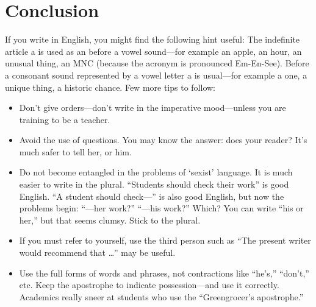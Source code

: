 \chapter{Conclusion}
\label{chap:six}

If you write in English, you might find the following hint
useful: The indefinite article a is used as an before a
vowel sound---for example an apple, an hour, an unusual
thing, an \ac{MNC} (because the acronym is pronounced Em-En-See). Before a consonant sound represented
by a vowel letter a is usual---for example a one, a
unique thing, a historic chance. Few more tips to follow:


\begin{itemize}
\item Don't give orders---don't write in the imperative mood---unless you are training to be a teacher.
\item Avoid the use of questions. You may know the answer: does your reader? It's much safer to tell her, or him.
\item Do not become entangled in the problems of `sexist' language. It is much easier to write in the plural. ``Students should check their work'' is good English. ``A student should check---'' is also good English, but now the problems begin: ``---her work?'' ``---his work?'' Which? You can write ``his or her,'' but that seems clumsy. Stick to the plural.
\item If you must refer to yourself, use the third person such as ``The present writer would recommend that \ldots'' may be useful.
\item Use the full forms of words and phrases, not contractions like ``he's,'' ``don't,'' etc. Keep the apostrophe to indicate possession---and use it correctly. Academics really sneer at students who use the ``Greengrocer's apostrophe.''
\end{itemize}


